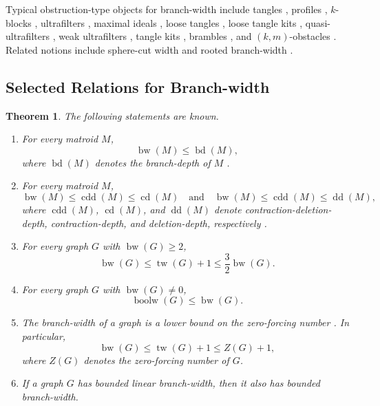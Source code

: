 \documentclass[10pt]{book}
\newtheorem{theorem}{Theorem}[section]
\theoremstyle{definition}
\begin{document}
Typical obstruction-type objects for branch-width include tangles \cite{9,Hicks2005GraphsBA}, profiles \cite{376,377,378,379,380}, \(k\)-blocks \cite{381,382,383}, ultrafilters \cite{16}, maximal ideals \cite{49}, loose tangles \cite{10}, loose tangle kits \cite{10}, quasi-ultrafilters \cite{14}, weak ultrafilters \cite{15}, tangle kits \cite{Oum2006CertifyingLB}, brambles \cite{Lyaudet2009PartitionsVS,amini2009submodular}, and \((k,m)\)-obstacles \cite{50}.  
Related notions include sphere-cut width \cite{338} and rooted branch-width \cite{153}.

\subsection{Selected Relations for Branch-width}

\begin{theorem}
The following statements are known.
\begin{enumerate}
    \item For every matroid \(M\),
    \[
    \operatorname{bw}(M)\leq \operatorname{bd}(M),
    \]
    where \(\operatorname{bd}(M)\) denotes the branch-depth of \(M\) \cite{329}.

    \item For every matroid \(M\),
    \[
    \operatorname{bw}(M)\leq \operatorname{cdd}(M)\leq \operatorname{cd}(M)
    \quad\text{and}\quad
    \operatorname{bw}(M)\leq \operatorname{cdd}(M)\leq \operatorname{dd}(M),
    \]
    where \(\operatorname{cdd}(M)\), \(\operatorname{cd}(M)\), and \(\operatorname{dd}(M)\) denote contraction-deletion-depth, contraction-depth, and deletion-depth, respectively \cite{311}.

    \item For every graph \(G\) with \(\operatorname{bw}(G)\geq 2\),
    \[
    \operatorname{bw}(G)\leq \operatorname{tw}(G)+1
    \leq \frac{3}{2}\operatorname{bw}(G).
    \]
    \cite{213}

    \item For every graph \(G\) with \(\operatorname{bw}(G)\neq 0\),
    \[
    \operatorname{boolw}(G)\leq \operatorname{bw}(G).
    \]
    \cite{313}

    \item The branch-width of a graph is a lower bound on the zero-forcing number \cite{fast2018effects}.  
    In particular,
    \[
    \operatorname{bw}(G)\leq \operatorname{tw}(G)+1 \leq Z(G)+1,
    \]
    where \(Z(G)\) denotes the zero-forcing number of \(G\). \cite{fast2018effects}

    \item If a graph \(G\) has bounded linear branch-width, then it also has bounded branch-width.
\end{enumerate}
\end{theorem}
\end{document}

